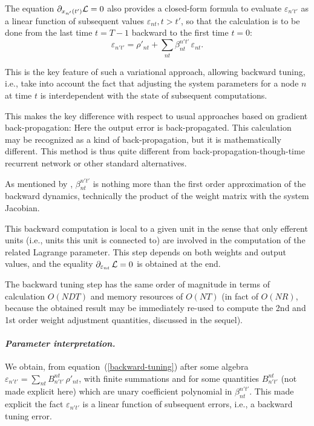 The equation $\partial_{x_{n'}(t')} {\cal L}  = 0$ also provides a closed-form formula to evaluate $\varepsilon_{n't'}$ as a linear function of subsequent values $\varepsilon_{nt}, t > t'$, so that the calculation is to be done from the last time $t = T-1$ backward to the first time $t = 0$:
\begin{equation} \label{backward-tuning}
\varepsilon_{n't'} = \rho'_{nt} + \sum_{nt} \beta_{nt}^{n't'} \, \varepsilon_{nt}.
\end{equation}

This is the key feature of such a variational approach, allowing backward tuning, i.e., take into account the fact that adjusting the system parameters for a node $n$ at time $t$ is interdependent with the state of subsequent computations.

This makes the key difference with respect to usual approaches based on gradient back-propagation: Here the output error is back-propagated. 
This calculation may be recognized as a kind of back-propagation, but it is mathematically different.
This method is thus quite different from back-propagation-though-time recurrent network or other standard alternatives. 


As mentioned by \cite{cun_theoretical_1988}, $\beta_{nt}^{n't'}$ is nothing more than the first order approximation of the backward dynamics, technically the product of the weight matrix with the system Jacobian.

This backward computation is local to a given unit in the sense that only efferent units (i.e., units this unit is connected to) are involved in the computation of the related Lagrange parameter. This step depends on both weights and output values, and the equality $\partial_{\varepsilon_{nt}} \, {\cal L} = 0$ is obtained at the end.

The backward tuning step has the same order of magnitude in terms of calculation $O(N D T)$  and memory resources of $O(N T)$ (in fact of $O(N R)$, because the obtained result may be immediately re-used to compute the 2nd and 1st order weight adjustment quantities, discussed in the sequel). 

\paragraph{\em Parameter interpretation.}

We obtain, from equation~(\ref{backward-tuning}) after some algebra $\varepsilon_{n't'} = \sum_{nt} B_{n't'}^{nt} \, \rho'_{nt}$, with finite summations and for some quantities $B_{n't'}^{nt}$ (not made explicit here) which are unary coefficient polynomial in $\beta_{nt}^{n't'}$. This made explicit the fact $\varepsilon_{n't'}$ is a linear function of subsequent errors, i.e., a backward tuning error.

